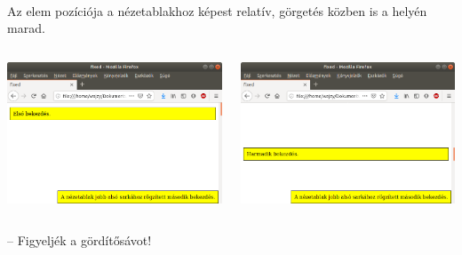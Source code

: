 \begin{frame}
  \begin{description}[m]
    \item[\texttt{fixed}] \hfill \\ Az elem pozíciója a nézetablakhoz képest relatív, görgetés közben is a helyén marad.
  \end{description}
  \begin{columns}[c]
      \begin{center}
        \includegraphics[width=\textwidth]{fixed1.png}
      \end{center}
      \begin{center}
        \includegraphics[width=\textwidth]{fixed2.png}
      \end{center}
  \end{columns}
  \begin{center}
     -- Figyeljék a gördítősávot!
  \end{center}
\end{frame}

